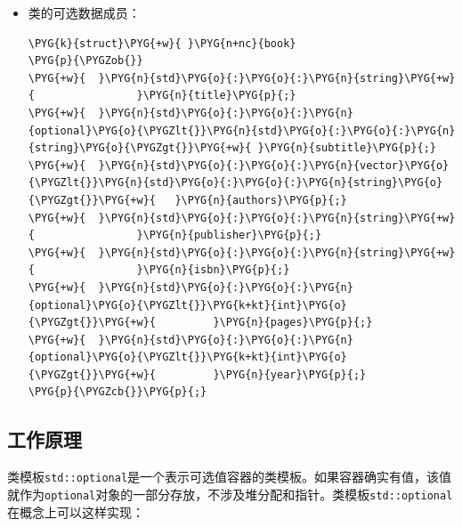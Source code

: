 \begin{itemize}

\item 类的可选数据成员：



\begin{codeblockbg}
\begin{Verbatim}[commandchars=\\\{\},breaklines=true,breakanywhere=true,fontsize=\codefont,xleftmargin=17bp]
\PYG{k}{struct}\PYG{+w}{ }\PYG{n+nc}{book}
\PYG{p}{\PYGZob{}}
\PYG{+w}{  }\PYG{n}{std}\PYG{o}{:}\PYG{o}{:}\PYG{n}{string}\PYG{+w}{                }\PYG{n}{title}\PYG{p}{;}
\PYG{+w}{  }\PYG{n}{std}\PYG{o}{:}\PYG{o}{:}\PYG{n}{optional}\PYG{o}{\PYGZlt{}}\PYG{n}{std}\PYG{o}{:}\PYG{o}{:}\PYG{n}{string}\PYG{o}{\PYGZgt{}}\PYG{+w}{ }\PYG{n}{subtitle}\PYG{p}{;}
\PYG{+w}{  }\PYG{n}{std}\PYG{o}{:}\PYG{o}{:}\PYG{n}{vector}\PYG{o}{\PYGZlt{}}\PYG{n}{std}\PYG{o}{:}\PYG{o}{:}\PYG{n}{string}\PYG{o}{\PYGZgt{}}\PYG{+w}{   }\PYG{n}{authors}\PYG{p}{;}
\PYG{+w}{  }\PYG{n}{std}\PYG{o}{:}\PYG{o}{:}\PYG{n}{string}\PYG{+w}{                }\PYG{n}{publisher}\PYG{p}{;}
\PYG{+w}{  }\PYG{n}{std}\PYG{o}{:}\PYG{o}{:}\PYG{n}{string}\PYG{+w}{                }\PYG{n}{isbn}\PYG{p}{;}
\PYG{+w}{  }\PYG{n}{std}\PYG{o}{:}\PYG{o}{:}\PYG{n}{optional}\PYG{o}{\PYGZlt{}}\PYG{k+kt}{int}\PYG{o}{\PYGZgt{}}\PYG{+w}{         }\PYG{n}{pages}\PYG{p}{;}
\PYG{+w}{  }\PYG{n}{std}\PYG{o}{:}\PYG{o}{:}\PYG{n}{optional}\PYG{o}{\PYGZlt{}}\PYG{k+kt}{int}\PYG{o}{\PYGZgt{}}\PYG{+w}{         }\PYG{n}{year}\PYG{p}{;}
\PYG{p}{\PYGZcb{}}\PYG{p}{;}
\end{Verbatim}
\end{codeblockbg}

\end{itemize}



\subsection{工作原理}



类模板\texttt{std::\allowbreak{}optional}是一个表示可选值容器的类模板。如果容器确实有值，该值就作为\texttt{optional}对象的一部分存放，不涉及堆分配和指针。类模板\texttt{std::\allowbreak{}optional}在概念上可以这样实现：



